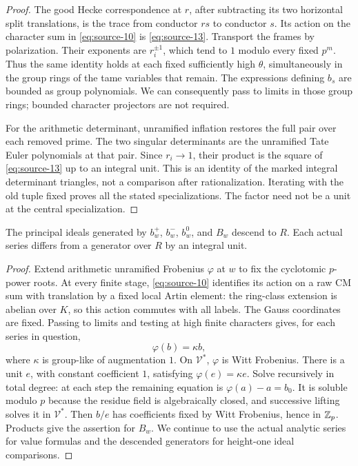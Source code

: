 \begin{proof}
The good Hecke correspondence at \(r\), after subtracting its two
horizontal split translations, is the trace from conductor \(rs\)
to conductor \(s\).  Its action on the character sum in
\eqref{eq:source-10} is \eqref{eq:source-13}.
Transport the frames by polarization.  Their exponents are
\(r_i^{\pm1}\), which tend to \(1\) modulo every fixed \(p^m\).
Thus the same identity holds at each fixed sufficiently high
\(\theta\), simultaneously in the group rings of the tame variables
that remain.  The expressions defining \(b_s\) are bounded as group
polynomials.  We can consequently pass to limits in those group
rings; bounded character projectors are not required.

For the arithmetic determinant, unramified inflation restores the
full pair over each removed prime.  The two singular determinants
are the unramified Tate Euler polynomials at that pair.
Since \(r_i\to1\), their product is the square of
\eqref{eq:source-13} up to an integral unit.  This is an identity of
the marked integral determinant triangles, not a comparison after
rationalization.  Iterating with the old tuple fixed proves all the
stated specializations.  The factor need not be a unit at the
central specialization.
\end{proof}

\begin{lemma}\label{pair:descent}
The principal ideals generated by \(b_w^+\), \(b_w^-\), \(b_w^0\),
and \(B_w\) descend to \(R\).  Each actual series differs from a
generator over \(R\) by an integral unit.
\end{lemma}

\begin{proof}
Extend arithmetic unramified Frobenius \(\varphi\) at \(w\) to fix
the cyclotomic \(p\)-power roots.  At every finite stage,
\eqref{eq:source-10} identifies its action on a raw CM sum with
translation by a fixed local Artin element: the ring-class extension
is abelian over \(K\), so this action commutes with all labels.
The Gauss coordinates are fixed.  Passing to limits and testing at
high finite characters gives, for each series in question,
\[
 \varphi(b)=\kappa b,
\]
where \(\kappa\) is group-like of augmentation \(1\).
On \(\mathcal V^*\), \(\varphi\) is Witt Frobenius.
There is a unit \(e\), with constant coefficient \(1\), satisfying
\(\varphi(e)=\kappa e\).  Solve recursively in total degree: at each
step the remaining equation is \(\varphi(a)-a=b_0\).
It is soluble modulo \(p\) because the residue field is algebraically
closed, and successive lifting solves it in \(\mathcal V^*\).
Then \(b/e\) has coefficients fixed by Witt Frobenius, hence in
\(\mathbb Z_p\).  Products give the assertion for \(B_w\).
We continue to use the actual analytic series for value formulas
and the descended generators for height-one ideal comparisons.
\end{proof}

